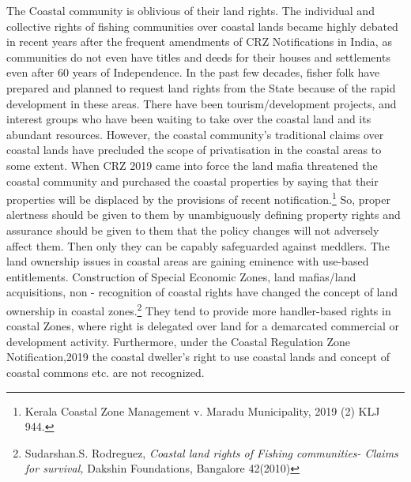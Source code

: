 \begin{multicols}{2}
\noi
The Coastal community is oblivious of their land rights. The individual and collective rights
of fishing communities over coastal lands became highly debated in recent years after the
frequent amendments of CRZ Notifications in India, as communities do not even have titles
and deeds for their houses and settlements even after 60 years of Independence. In the past
few decades, fisher folk have prepared and planned to request land rights from the State
because of the rapid development in these areas. There have been tourism/development
projects, and interest groups who have been waiting to take over the coastal land and its
abundant resources. However, the coastal community’s traditional claims over coastal lands
have precluded the scope of privatisation in the coastal areas to some extent. When CRZ
2019 came into force the land mafia threatened the coastal community and purchased the
coastal properties by saying that their properties will be displaced by the provisions of recent
notification.\footnote{Kerala Coastal Zone Management v. Maradu Municipality, 2019 (2) KLJ 944.} So, proper alertness should be given to them by unambiguously defining
property rights and assurance should be given to them that the policy changes will not
adversely affect them. Then only they can be capably safeguarded against meddlers. The land 
ownership issues in coastal areas are gaining eminence with use-based entitlements.
Construction of Special Economic Zones, land mafias/land acquisitions, non - recognition of
coastal rights have changed the concept of land ownership in coastal zones.\footnote{Sudarshan.S. Rodreguez, \textit{Coastal land rights of Fishing communities- Claims for survival,} Dakshin
Foundations, Bangalore 42(2010)} They tend to
provide more handler-based rights in coastal Zones, where right is delegated over land for a
demarcated commercial or development activity. Furthermore, under the Coastal Regulation
Zone Notification,2019 the coastal dweller’s right to use coastal lands and concept of coastal
commons etc. are not recognized.


\end{multicols}
